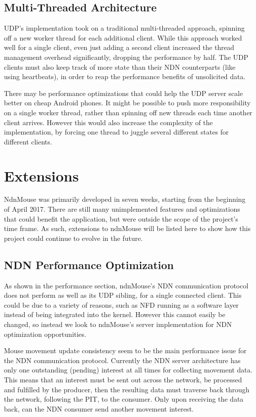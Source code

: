 \documentclass{sig-alternate}
\renewcommand\_{\textunderscore\allowbreak}  %
\begin{document}
\subsection{Multi-Threaded Architecture}
UDP's implementation took on a traditional multi-threaded approach, spinning off a new worker thread for each additional client. While this approach worked well for a single client, even just adding a second client increased the thread management overhead significantly, dropping the performance by half. The UDP clients must also keep track of more state than their NDN counterparts (like using heartbeats), in order to reap the performance benefits of unsolicited data.

There may be performance optimizations that could help the UDP server scale better on cheap Android phones. It might be possible to push more responsibility on a single worker thread, rather than spinning off new threads each time another client arrives. However this would also increase the complexity of the implementation, by forcing one thread to juggle several different states for different clients.

\section{Extensions}
NdnMouse was primarily developed in seven weeks, starting from the beginning of April 2017. There are still many unimplemented features and optimizations that could benefit the application, but were outside the scope of the project's time frame. As such, extensions to ndnMouse will be listed here to show how this project could continue to evolve in the future.

\subsection{NDN Performance Optimization}
As shown in the performance section, ndnMouse's NDN communication protocol does not perform as well as its UDP sibling, for a single connected client. This could be due to a variety of reasons, such as NFD running as a software layer instead of being integrated into the kernel. However this cannot easily be changed, so instead we look to ndnMouse's server implementation for NDN optimization opportunities.

Mouse movement update consistency seem to be the main performance issue for the NDN communication protocol. Currently the NDN server architecture has only one outstanding (pending) interest at all times for collecting movement data. This means that an interest must be sent out across the network, be processed and fulfilled by the producer, then the resulting data must traverse back through the network, following the PIT, to the consumer. Only upon receiving the data back, can the NDN consumer send another movement interest.
\end{document}
